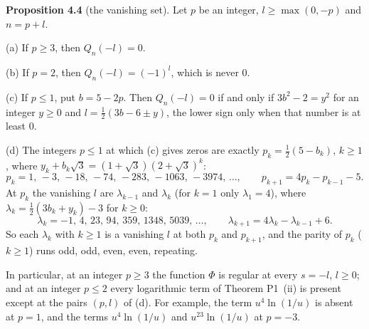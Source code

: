 \documentclass[11pt]{article}
\begin{document}
\medskip
\noindent\textbf{Proposition 4.4} (the vanishing set). Let $p$ be an integer, $l\ge\max(0,-p)$ and $n=p+l$.

(a) If $p\ge3$, then $Q_n(-l)=0$.

(b) If $p=2$, then $Q_n(-l)=(-1)^l$, which is never $0$.

(c) If $p\le1$, put $b=5-2p$. Then $Q_n(-l)=0$ if and only if $3b^2-2=y^2$ for an integer $y\ge0$ and $l=\frac12(3b-6\pm y)$, the lower sign only when that number is at least $0$.

(d) The integers $p\le1$ at which (c) gives zeros are exactly $p_k=\frac12(5-b_k)$, $k\ge1$, where $y_k+b_k\sqrt3=(1+\sqrt3)(2+\sqrt3)^k$:
\[
p_k=1,\,-3,\,-18,\,-74,\,-283,\,-1063,\,-3974,\,\dots,\qquad p_{k+1}=4p_k-p_{k-1}-5.
\]
At $p_k$ the vanishing $l$ are $\lambda_{k-1}$ and $\lambda_k$ (for $k=1$ only $\lambda_1=4$), where $\lambda_k=\frac12(3b_k+y_k)-3$ for $k\ge0$:
\[
\lambda_k=-1,\,4,\,23,\,94,\,359,\,1348,\,5039,\,\dots,\qquad \lambda_{k+1}=4\lambda_k-\lambda_{k-1}+6.
\]
So each $\lambda_k$ with $k\ge1$ is a vanishing $l$ at both $p_k$ and $p_{k+1}$, and the parity of $p_k$ ($k\ge1$) runs odd, odd, even, even, repeating.

In particular, at an integer $p\ge3$ the function $\Phi$ is regular at every $s=-l$, $l\ge0$; and at an integer $p\le2$ every logarithmic term of Theorem P1~(ii) is present except at the pairs $(p,l)$ of (d). For example, the term $u^4\ln(1/u)$ is absent at $p=1$, and the terms $u^4\ln(1/u)$ and $u^{23}\ln(1/u)$ at $p=-3$.
\end{document}
